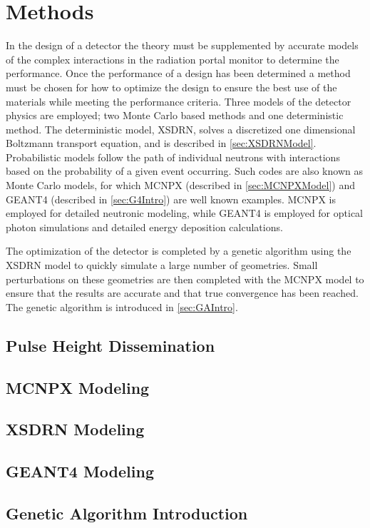 \chapter{Methods}
\label{chap:methods}
In the design of a detector the theory must be supplemented by accurate models of the complex interactions in the radiation portal monitor to determine the performance.
Once the performance of a design has been determined a method must be chosen for how to optimize the design to  ensure the best use of the materials while meeting the performance criteria.
Three models of the detector physics are employed; two Monte Carlo based methods and one deterministic method.
The deterministic model, XSDRN, solves a discretized one dimensional Boltzmann transport equation, and is described in \autoref{sec:XSDRNModel}.
Probabilistic models follow the path of individual neutrons with interactions based on the probability of a given event occurring.
Such codes are also known as Monte Carlo models, for which MCNPX (described in \autoref{sec:MCNPXModel}) and GEANT4 (described in \autoref{sec:G4Intro}) are well known examples.
MCNPX is employed for detailed neutronic modeling, while GEANT4 is employed for optical photon simulations and detailed energy deposition calculations.

The optimization of the detector is completed by a genetic algorithm using the XSDRN model to quickly simulate a large number of geometries.
Small perturbations on these geometries are then completed with the MCNPX model to ensure that the results are accurate and that true convergence has been reached.
The genetic algorithm is introduced in \autoref{sec:GAIntro}.

\section{Pulse Height Dissemination}
\label{sec:PulseHeightDiscrm}


\section{MCNPX Modeling}
\label{sec:MCNPXModel}


\section{XSDRN Modeling}
\label{sec:XSDRNModel}


\section{GEANT4 Modeling}
\label{sec:G4Intro}


\section{Genetic Algorithm Introduction}
\label{sec:GAIntro}

